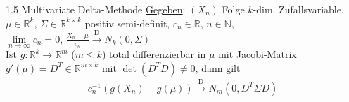 \documentclass[a4paper,openany]{book}
\theoremstyle{mytheoremstyle}
\theoremstyle{mytheoremstyle2}
\begin{document}
\begin{theo}{1.5 Multivariate Delta-Methode}{}
  \underline{Gegeben}: $(X_n)$ Folge $k$-dim. Zufallsvariable, $\mu \in \mathbb{R}^k$, $\Sigma \in \mathbb{R}^{k \times k}$  positiv semi-definit, $c_n \in \mathbb{R}$, $n \in \mathbb{N}$,\\
  $\lim\limits_{n\to \infty }{c_n}=0$, $\frac{X_n-\mu }{c_n}\overset{\text{D}}\to N_k(0,\Sigma)$ \\
  Ist $g:\mathbb{R}^k\to \mathbb{R}^m$ ($m \leq k$) total differenzierbar in $\mu $ mit Jacobi-Matrix $g'(\mu )=D^T \in \mathbb{R}^{m \times k}$ mit $\det(D^TD)\neq 0$, dann gilt
  \begin{align*}
    c_n ^{-1}(g(X_n)-g(\mu ))\overset{\text{D}}\to N_m \left(0,D^T\Sigma D\right)
  \end{align*}
\end{theo}
\end{document}
